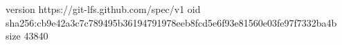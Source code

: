version https://git-lfs.github.com/spec/v1
oid sha256:cb9e42a3c7c789495b36194791978eeb8fcd5e6f93e81560e03fe97f7332ba4b
size 43840
